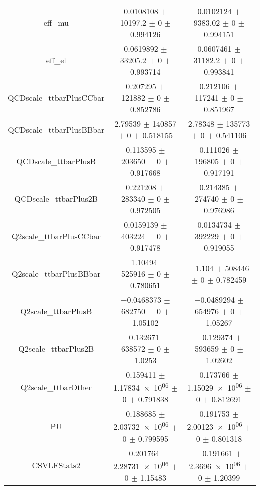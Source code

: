 \begin{table}
\begin{tabular}{ccc}
eff\_mu & \num{0.0108108} $\pm$ \num{10197.2} $\pm$ \num{0} $\pm$ \num{0.994126} & \num{0.0102124} $\pm$ \num{9383.02} $\pm$ \num{0} $\pm$ \num{0.994151}\\
eff\_el & \num{0.0619892} $\pm$ \num{33205.2} $\pm$ \num{0} $\pm$ \num{0.993714} & \num{0.0607461} $\pm$ \num{31182.2} $\pm$ \num{0} $\pm$ \num{0.993841}\\
QCDscale\_ttbarPlusCCbar & \num{0.207295} $\pm$ \num{121882} $\pm$ \num{0} $\pm$ \num{0.852786} & \num{0.212106} $\pm$ \num{117241} $\pm$ \num{0} $\pm$ \num{0.851967}\\
QCDscale\_ttbarPlusBBbar & \num{2.79539} $\pm$ \num{140857} $\pm$ \num{0} $\pm$ \num{0.518155} & \num{2.78348} $\pm$ \num{135773} $\pm$ \num{0} $\pm$ \num{0.541106}\\
QCDscale\_ttbarPlusB & \num{0.113595} $\pm$ \num{203650} $\pm$ \num{0} $\pm$ \num{0.917668} & \num{0.111026} $\pm$ \num{196805} $\pm$ \num{0} $\pm$ \num{0.917191}\\
QCDscale\_ttbarPlus2B & \num{0.221208} $\pm$ \num{283340} $\pm$ \num{0} $\pm$ \num{0.972505} & \num{0.214385} $\pm$ \num{274740} $\pm$ \num{0} $\pm$ \num{0.976986}\\
Q2scale\_ttbarPlusCCbar & \num{0.0159139} $\pm$ \num{403224} $\pm$ \num{0} $\pm$ \num{0.917478} & \num{0.0134734} $\pm$ \num{392229} $\pm$ \num{0} $\pm$ \num{0.919055}\\
Q2scale\_ttbarPlusBBbar & \num{-1.10494} $\pm$ \num{525916} $\pm$ \num{0} $\pm$ \num{0.780651} & \num{-1.104} $\pm$ \num{508446} $\pm$ \num{0} $\pm$ \num{0.782459}\\
Q2scale\_ttbarPlusB & \num{-0.0468373} $\pm$ \num{682750} $\pm$ \num{0} $\pm$ \num{1.05102} & \num{-0.0489294} $\pm$ \num{654976} $\pm$ \num{0} $\pm$ \num{1.05267}\\
Q2scale\_ttbarPlus2B & \num{-0.132671} $\pm$ \num{638572} $\pm$ \num{0} $\pm$ \num{1.0253} & \num{-0.129374} $\pm$ \num{593659} $\pm$ \num{0} $\pm$ \num{1.02602}\\
Q2scale\_ttbarOther & \num{0.159411} $\pm$ \num{1.17834e+06} $\pm$ \num{0} $\pm$ \num{0.791838} & \num{0.173766} $\pm$ \num{1.15029e+06} $\pm$ \num{0} $\pm$ \num{0.812691}\\
PU & \num{0.188685} $\pm$ \num{2.03732e+06} $\pm$ \num{0} $\pm$ \num{0.799595} & \num{0.191753} $\pm$ \num{2.00123e+06} $\pm$ \num{0} $\pm$ \num{0.801318}\\
CSVLFStats2 & \num{-0.201764} $\pm$ \num{2.28731e+06} $\pm$ \num{0} $\pm$ \num{1.15483} & \num{-0.191661} $\pm$ \num{2.3696e+06} $\pm$ \num{0} $\pm$ \num{1.20399}\\

\end{tabular}
\end{table}
